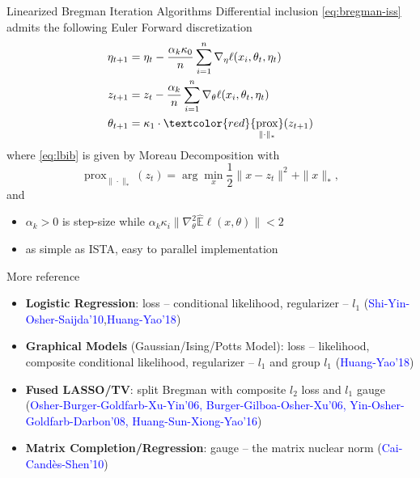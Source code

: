 \documentclass[slidestop,compress,9pt,epsfig,color]{beamer}
\providecommand{\E}{\mathbb{E}}
\theoremstyle{example}
\DeclareMathOperator{\prox}{prox}
\begin{document}
\begin{frame}{Linearized Bregman Iteration Algorithms}
Differential inclusion \eqref{eq:bregman-iss} admits the following Euler Forward discretization
\begin{subequations}
\begin{align}
 \eta_{t+1} & = \eta_t -  \frac{\alpha_k \kappa_0}{n} \sum_{i=1}^n \nabla_{\eta} \ell(x_i,\theta_t, \eta_t)  \label{eq:lbic}\\
 z_{t+1} &= z_t  -\frac{\alpha_k}{n} \sum_{i=1}^n \nabla_{\theta} \ell(x_i,\theta_t, \eta_t) \label{eq:lbia}\\
 \theta_{t+1} & = \kappa_1 \cdot \textcolor{red}{\prox_{\|\cdot\|_*}}(z_{t+1}) \label{eq:lbib}
\end{align}
\end{subequations}
where \eqref{eq:lbib} is given by Moreau Decomposition with $$\prox_{\|\cdot\|_*}(z_t)=\arg\min_x \frac{1}{2}\|x-z_t\|^2+\|x\|_*,$$
and
\begin{itemize}
\item $\alpha_k>0$ is step-size while $\alpha_k \kappa_i \|\nabla^2_\theta\hat{\E} \ell (x,\theta)\|<2$
\item as simple as ISTA, easy to parallel implementation
\end{itemize}

\end{frame}


\begin{frame}{More reference}
\begin{itemize}
\item \textbf{Logistic Regression}: loss -- conditional likelihood, regularizer -- $l_1$ (\textcolor{blue}{Shi-Yin-Osher-Saijda'10},\textcolor{blue}{Huang-Yao'18})
\item \textbf{Graphical Models} (Gaussian/Ising/Potts Model): loss -- likelihood, composite conditional likelihood, regularizer -- $l_1$ and group $l_1$ (\textcolor{blue}{Huang-Yao'18})
\item \textbf{Fused LASSO/TV}: split Bregman with composite $l_2$ loss and $l_1$ gauge (\textcolor{blue}{Osher-Burger-Goldfarb-Xu-Yin'06, Burger-Gilboa-Osher-Xu'06, Yin-Osher-Goldfarb-Darbon'08, Huang-Sun-Xiong-Yao'16})
\item \textbf{Matrix Completion/Regression}: gauge -- the matrix nuclear norm (\textcolor{blue}{Cai-Cand\`es-Shen'10})
\end{itemize}
\end{frame}
\end{document}
